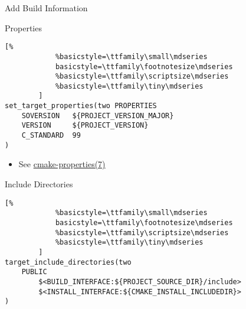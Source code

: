 \documentclass[t]{beamer}
\begin{document}
\begin{frame}[fragile]{Add Build Information}
    \begin{block}{Properties}
        \begin{lstlisting}[%
            %basicstyle=\ttfamily\small\mdseries
            basicstyle=\ttfamily\footnotesize\mdseries
            %basicstyle=\ttfamily\scriptsize\mdseries
            %basicstyle=\ttfamily\tiny\mdseries
        ]
set_target_properties(two PROPERTIES
    SOVERSION   ${PROJECT_VERSION_MAJOR}
    VERSION     ${PROJECT_VERSION}
    C_STANDARD  99
)
        \end{lstlisting}

        \begin{itemize}
            \item See
                \href{https://cmake.org/cmake/help/latest/manual/cmake-properties.7.html}{cmake-properties(7)}
        \end{itemize}
    \end{block}

    \pause

    \begin{block}{Include Directories}
        \begin{lstlisting}[%
            %basicstyle=\ttfamily\small\mdseries
            basicstyle=\ttfamily\footnotesize\mdseries
            %basicstyle=\ttfamily\scriptsize\mdseries
            %basicstyle=\ttfamily\tiny\mdseries
        ]
target_include_directories(two
    PUBLIC
        $<BUILD_INTERFACE:${PROJECT_SOURCE_DIR}/include>
        $<INSTALL_INTERFACE:${CMAKE_INSTALL_INCLUDEDIR}>
)
        \end{lstlisting}
    \end{block}
\end{frame}
\end{document}
